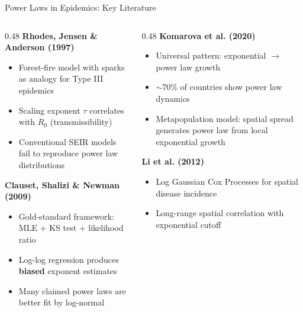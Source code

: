 \documentclass[10pt,aspectratio=169]{beamer}
\begin{document}
\begin{frame}{Power Laws in Epidemics: Key Literature}
\begin{columns}[T]
\begin{column}{0.48\textwidth}
\textbf{Rhodes, Jensen \& Anderson (1997)}
\begin{itemize}
    \item Forest-fire model with sparks as analogy for Type III epidemics
    \item Scaling exponent $\tau$ correlates with $R_0$ (transmissibility)
    \item Conventional SEIR models fail to reproduce power law distributions
\end{itemize}

\vspace{0.3cm}

\textbf{Clauset, Shalizi \& Newman (2009)}
\begin{itemize}
    \item Gold-standard framework: MLE + KS test + likelihood ratio
    \item Log-log regression produces \textbf{biased} exponent estimates
    \item Many claimed power laws are better fit by log-normal
\end{itemize}
\end{column}

\begin{column}{0.48\textwidth}
\textbf{Komarova et al. (2020)}
\begin{itemize}
    \item Universal pattern: exponential $\to$ power law growth
    \item $\sim$70\% of countries show power law dynamics
    \item Metapopulation model: spatial spread generates power law from local exponential growth
\end{itemize}

\vspace{0.3cm}

\textbf{Li et al. (2012)}
\begin{itemize}
    \item Log Gaussian Cox Processes for spatial disease incidence
    \item Long-range spatial correlation with exponential cutoff
\end{itemize}
\end{column}
\end{columns}
\end{frame}
\end{document}
